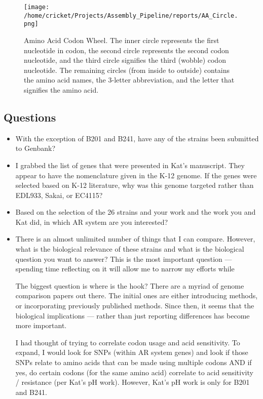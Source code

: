\documentclass[11pt]{article}
\begin{document}
\begin{figure}[h!]\normalsize %
\centering
\texttt{[image: /home/cricket/Projects/Assembly\_Pipeline/reports/AA\_Circle.png]}
\caption{Amino Acid Codon Wheel. The inner circle represents the first nucleotide in codon, the second circle represents the second codon nucleotide, and the third circle signifies the third (wobble) codon nucleotide. The remaining circles (from inside to outside) contains the amino acid names, the 3-letter abbreviation, and the letter that signifies the amino acid.}
\label{AA}
\end{figure}
\clearpage

\subsection*{Questions}
\begin{itemize}
\item With the exception of B201 and B241, have any of the strains been submitted to Genbank?
\item I grabbed the list of genes that were presented in Kat's manuscript. They appear to have the nomenclature given in the K-12 genome. If the genes were selected based on K-12 literature, why was this genome targeted rather than EDL933, Sakai, or EC4115? 
\item Based on the selection of the 26 strains and your work and the work you and Kat did, in which AR system are you interested?

\item There is an almost unlimited number of things that I can compare. However, what is the biological relevance of these strains and what is the biological question you want to answer? This is the most important question --- spending time reflecting on it will allow me to narrow my efforts while 

The biggest question is where is the hook? There are a myriad of genome comparison papers out there. The initial ones are either introducing methods, or incorporating previously published methods. Since then, it seems that the biological implications --- rather than just reporting differences has become more important. 

I had thought of trying to correlate codon usage and acid sensitivity. To expand, I would look for SNPs (within AR system genes) and look if those SNPs relate to amino acids that can be made using multiple codons AND if yes, do certain codons (for the same amino acid) correlate to acid sensitivity / resistance (per Kat's pH work). However, Kat's pH work is only for B201 and B241. 

\end{itemize}
\end{document}
